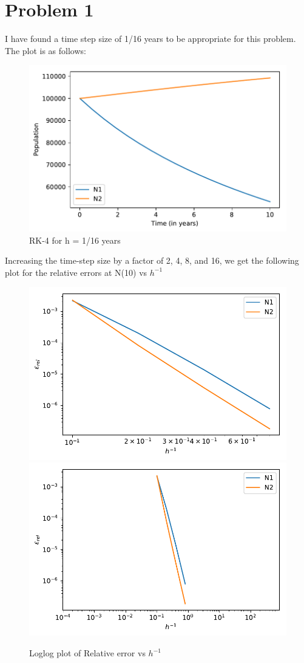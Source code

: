 \documentclass[12pt,letterpaper]{article}
\begin{document}
\section*{Problem 1}

I have found a time step size of 1/16 years to be appropriate for this problem. The plot is as follows:

\begin{figure}[H]
\centering
\includegraphics[scale=0.7]{"../hw6_1"}
\caption{RK-4 for h = 1/16 years}
\end{figure}

Increasing the time-step size by a factor of 2, 4, 8, and 16, we get the following plot for the relative errors at N(10) vs $h^{-1}$

\begin{figure}[H]
\centering
\includegraphics[width=.5\textwidth]{"../hw6_2"}\hfill
\includegraphics[width=.5\textwidth]{"../hw6_3"}\\
\caption{Loglog plot of Relative error vs $h^{-1}$}
\end{figure}
\end{document}

